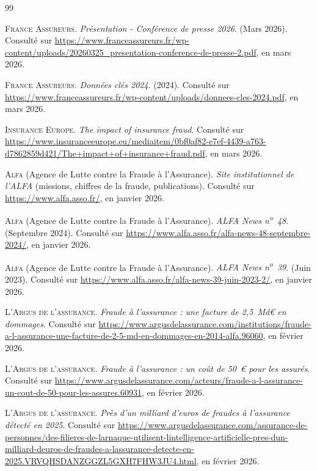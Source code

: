 \begin{thebibliography}{99}
{}

\textsc{France Assureurs}. \textit{Présentation - Conférence de presse 2026}. (Mars 2026). Consulté sur \url{https://www.franceassureurs.fr/wp-content/uploads/20260325_presentation-conference-de-presse-2.pdf}, en mars 2026.

\textsc{France Assureurs}. \textit{Données clés 2024}. (2024). Consulté sur \url{https://www.franceassureurs.fr/wp-content/uploads/donnees-cles-2024.pdf}, en mars 2026.

\textsc{Insurance Europe}. \textit{The impact of insurance fraud}. Consulté sur \url{https://www.insuranceeurope.eu/mediaitem/0bf0af82-e7ef-4439-a763-d7862859d421/The+impact+of+insurance+fraud.pdf}, en mars 2026.

\textsc{Alfa} (Agence de Lutte contre la Fraude à l'Assurance). \textit{Site institutionnel de l'ALFA} (missions, chiffres de la fraude, publications). Consulté sur \url{https://www.alfa.asso.fr/}, en janvier 2026.

\textsc{Alfa} (Agence de Lutte contre la Fraude à l'Assurance). \textit{ALFA News n\textsuperscript{o}~48}. (Septembre 2024). Consulté sur \url{https://www.alfa.asso.fr/alfa-news-48-septembre-2024/}, en janvier 2026.

\textsc{Alfa} (Agence de Lutte contre la Fraude à l'Assurance). \textit{ALFA News n\textsuperscript{o}~39}. (Juin 2023). Consulté sur \url{https://www.alfa.asso.fr/alfa-news-39-juin-2023-2/}, en janvier 2026.

\textsc{L'Argus de l'assurance}. \textit{Fraude à l'assurance : une facture de 2,5~Md\euro{} en dommages}. Consulté sur \url{https://www.argusdelassurance.com/institutions/fraude-a-l-assurance-une-facture-de-2-5-md-en-dommages-en-2014-alfa.96060}, en février 2026.

\textsc{L'Argus de l'assurance}. \textit{Fraude à l'assurance : un coût de 50~\euro{} pour les assurés}. Consulté sur \url{https://www.argusdelassurance.com/acteurs/fraude-a-l-assurance-un-cout-de-50-pour-les-assures.60931}, en février 2026.

\textsc{L'Argus de l'assurance}. \textit{Près d'un milliard d'euros de fraudes à l'assurance détecté en 2025}. Consulté sur {\scriptsize\def\UrlBreaks{\do\/\do-\do.}\url{https://www.argusdelassurance.com/assurance-de-personnes/des-filieres-de-larnaque-utilisent-lintelligence-artificielle-pres-dun-milliard-deuros-de-fraudes-a-lassurance-detecte-en-2025.VRVQHSDANZGGZL5GXH7FHW3JU4.html}}, en février 2026.


\end{thebibliography}
